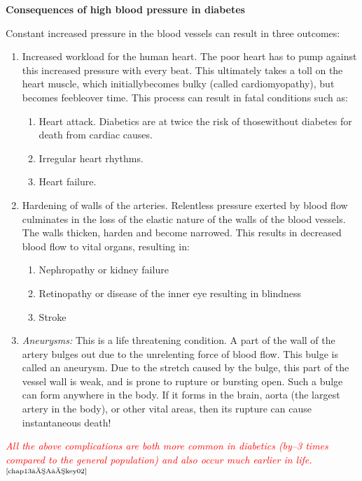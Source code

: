 \vskip 8pt
\noindent\textbf{Consequences of high blood pressure in diabetes}

Constant increased pressure in the blood vessels can result in three outcomes:

\begin{enumerate}
\itemsep=0pt
\item Increased workload for the human heart. The poor heart has to pump against this increased pressure with every beat. This ultimately takes a toll on the heart muscle, which initially\break becomes bulky (called cardiomyopathy), but becomes feeble\break over time. This process can result in fatal conditions such as:
\begin{enumerate}
\itemsep=0pt
 \item Heart attack. Diabetics are at twice the risk of those\break without diabetes for death from cardiac causes.
\item Irregular heart rhythms.
\item Heart failure.
\end{enumerate}
\item Hardening of walls of the arteries. Relentless pressure exerted by blood flow culminates in the loss of the elastic nature of the walls of the blood vessels. The walls thicken, harden and become narrowed. This results in decreased blood flow to vital organs, resulting in:
\begin{enumerate}
\itemsep=0pt
\item Nephropathy or kidney failure
\item Retinopathy or disease of the inner eye resulting in blindness
\item Stroke
\end{enumerate}
\item \textit{Aneurysms:} This is a life threatening condition. A part of the wall of the artery bulges out due to the unrelenting force of blood flow. This bulge is called an aneurysm. Due to the stretch caused by the bulge, this part of the vessel wall is weak, and is prone to rupture or bursting open. Such a bulge can form anywhere in the body. If it forms in the brain, aorta (the largest artery in the body), or other vital areas, then its rupture can cause instantaneous death!
\end{enumerate}

\textcolor{red}{\textit{All the above complications are both more common in diabetics (by–3 times compared to the general population) and also occur much earlier in life.}}$^{\text{\cite{chap13–A–key02}}}$

